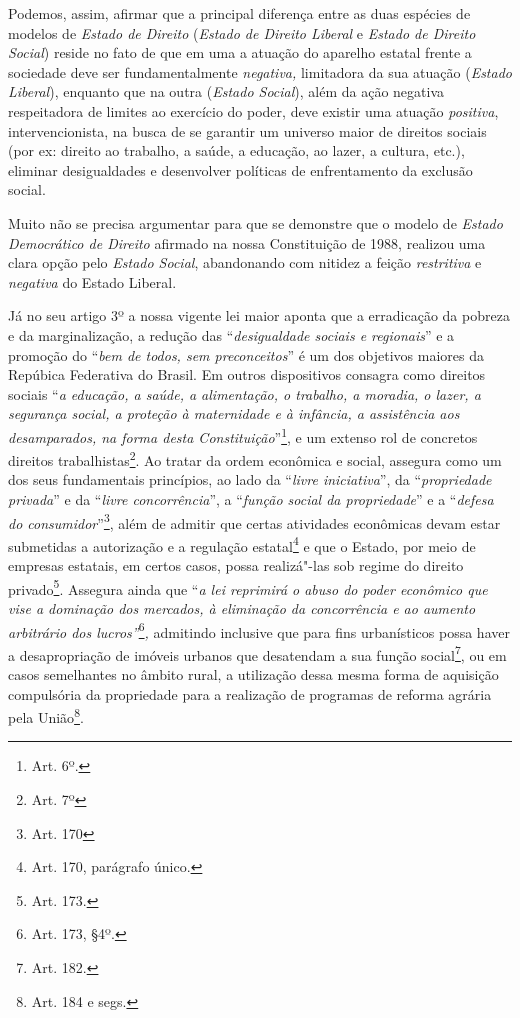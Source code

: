 Podemos, assim, afirmar que a principal diferença entre as duas espécies
de modelos de \emph{Estado de Direito} (\emph{Estado de Direito Liberal}
e \emph{Estado de Direito Social}) reside no fato de que em uma a
atuação do aparelho estatal frente a sociedade deve ser fundamentalmente
\emph{negativa,} limitadora da sua atuação (\emph{Estado Liberal}),
enquanto que na outra (\emph{Estado Social}), além da ação negativa
respeitadora de limites ao exercício do poder, deve existir uma atuação
\emph{positiva}, intervencionista, na busca de se garantir um universo
maior de direitos sociais (por ex: direito ao trabalho, a saúde, a
educação, ao lazer, a cultura, etc.), eliminar desigualdades e
desenvolver políticas de enfrentamento da exclusão social.

Muito não se precisa argumentar para que se demonstre que o modelo de
\emph{Estado Democrático de Direito} afirmado na nossa Constituição de
1988, realizou uma clara opção pelo \emph{Estado Social}, abandonando
com nitidez a feição \emph{restritiva} e \emph{negativa} do Estado
Liberal.

Já no seu artigo 3º a nossa vigente lei maior aponta que a erradicação
da pobreza e da marginalização, a redução das ``\emph{desigualdade
sociais e regionais}'' e a promoção do ``\emph{bem de todos, sem
preconceitos}'' é um dos objetivos maiores da Repúbica Federativa do
Brasil. Em outros dispositivos consagra como direitos sociais ``\emph{a
educação, a saúde, a alimentação, o trabalho, a moradia, o lazer, a
segurança social, a proteção à maternidade e à infância, a assistência
aos desamparados, na forma desta Constituição}''\footnote{Art. 6º.}, e
um extenso rol de concretos direitos trabalhistas\footnote{Art. 7º}. Ao
tratar da ordem econômica e social, assegura como um dos seus
fundamentais princípios, ao lado da ``\emph{livre iniciativa}'', da
``\emph{propriedade privada}'' e da ``\emph{livre concorrência}'', a
``\emph{função social da propriedade}'' e a ``\emph{defesa do
consumidor}''\footnote{Art. 170}, além de admitir que certas atividades
econômicas devam estar submetidas a autorização e a regulação
estatal\footnote{Art. 170, parágrafo único.} e que o Estado, por meio de
empresas estatais, em certos casos, possa realizá"-las sob regime do
direito privado\footnote{Art. 173.}. Assegura ainda que ``\emph{a lei
reprimirá o abuso do poder econômico que vise a dominação dos mercados,
à eliminação da concorrência e ao aumento arbitrário dos
lucros''}\footnote{Art. 173, §4º.}\emph{,} admitindo inclusive que para
fins urbanísticos possa haver a desapropriação de imóveis urbanos que
desatendam a sua função social\footnote{Art. 182.}, ou em casos
semelhantes no âmbito rural, a utilização dessa mesma forma de aquisição
compulsória da propriedade para a realização de programas de reforma
agrária pela União\footnote{Art. 184 e segs.}.

